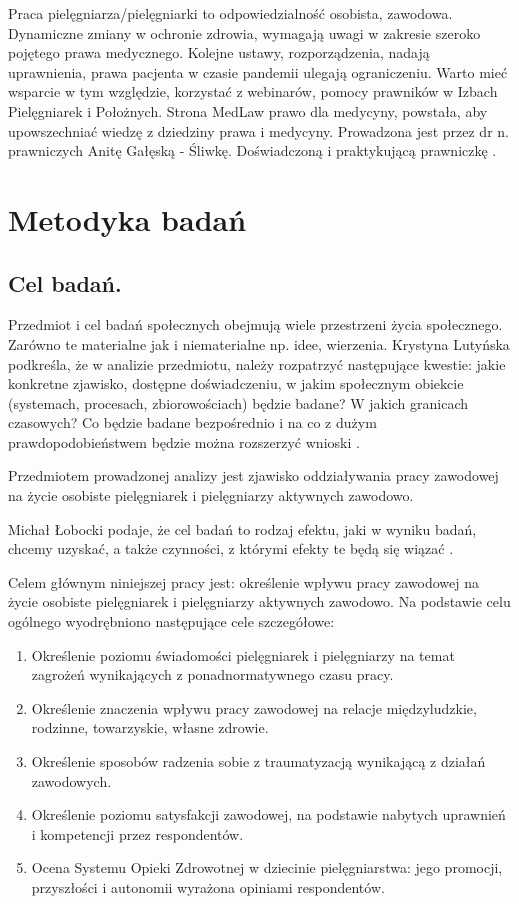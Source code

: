 \documentclass[a4paper,12pt,twoside,openright]{mwrep}
\begin{document}
Praca pielęgniarza/pielęgniarki to odpowiedzialność osobista, zawodowa. Dynamiczne zmiany w ochronie zdrowia, wymagają uwagi w zakresie szeroko pojętego prawa medycznego. Kolejne ustawy, rozporządzenia, nadają uprawnienia, prawa pacjenta w czasie pandemii ulegają ograniczeniu. Warto mieć wsparcie w tym względzie, korzystać z webinarów, pomocy prawników w Izbach Pielęgniarek i Położnych. Strona MedLaw prawo dla medycyny, powstała, aby upowszechniać wiedzę z dziedziny prawa i medycyny. Prowadzona jest przez dr n. prawniczych Anitę Gałęską - Śliwkę. Doświadczoną i praktykującą prawniczkę \cite{anita}.


\chapter{Metodyka badań}

\section{Cel badań.}
Przedmiot i cel badań społecznych obejmują wiele przestrzeni życia społecznego. Zarówno te materialne jak i niematerialne np. idee, wierzenia. Krystyna Lutyńska podkreśla, że w analizie przedmiotu, należy rozpatrzyć następujące kwestie: jakie konkretne zjawisko, dostępne doświadczeniu, w jakim społecznym obiekcie (systemach, procesach, zbiorowościach) będzie badane? W jakich granicach czasowych? Co będzie badane bezpośrednio i na co z dużym prawdopodobieństwem będzie można rozszerzyć wnioski \cite{krys}.

Przedmiotem prowadzonej analizy jest zjawisko oddziaływania pracy zawodowej na życie osobiste pielęgniarek i pielęgniarzy aktywnych zawodowo.

Michał Łobocki podaje, że cel badań to rodzaj efektu, jaki w wyniku badań, chcemy uzyskać, a także czynności, z którymi efekty te będą się wiązać \cite{mich}.

Celem głównym niniejszej pracy jest: określenie wpływu pracy zawodowej na życie osobiste pielęgniarek i pielęgniarzy aktywnych zawodowo.
Na podstawie celu ogólnego wyodrębniono następujące cele szczegółowe:
\begin{enumerate}
	\item Określenie poziomu świadomości pielęgniarek i pielęgniarzy na temat zagrożeń wynikających z ponadnormatywnego czasu pracy.
	\item Określenie znaczenia wpływu pracy zawodowej na relacje międzyludzkie, rodzinne, towarzyskie, własne zdrowie.
	\item Określenie sposobów radzenia sobie z traumatyzacją wynikającą z działań zawodowych.
	\item Określenie poziomu satysfakcji zawodowej, na podstawie nabytych uprawnień i kompetencji przez respondentów.
	\item Ocena Systemu Opieki Zdrowotnej w dziecinie pielęgniarstwa: jego promocji, przyszłości i autonomii wyrażona opiniami respondentów.
\end{enumerate}
\end{document}
